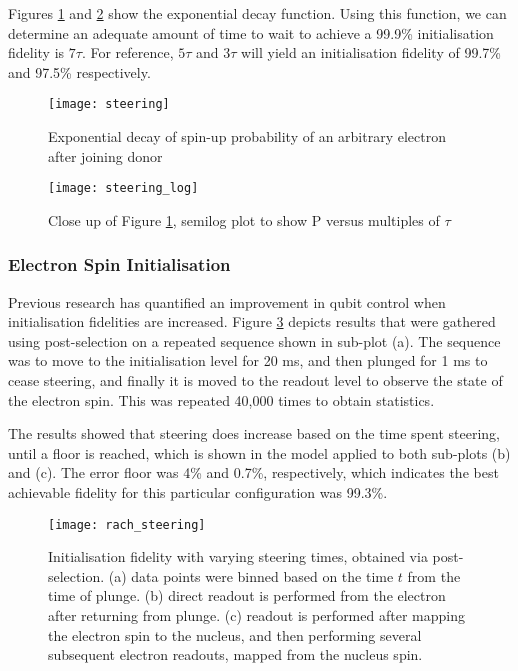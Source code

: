 	Figures \ref{fig::spin_steering} and \ref{fig::spin_steering_log} show the exponential decay function. Using this function, we can determine an adequate amount of time to wait to achieve a 99.9\% initialisation fidelity is $7 \tau$. For reference, $5 \tau$ and $3 \tau$ will yield an initialisation fidelity of 99.7\% and 97.5\% respectively.
	
	\begin{figure}[htbp!]
		\centering
		\texttt{[image: steering]}
		\caption{Exponential decay of spin-up probability of an arbitrary electron after joining donor}
		\label{fig::spin_steering}
	\end{figure}
	
	
	\begin{figure}[htbp!]
		\centering
		\texttt{[image: steering\_log]}
		\caption{Close up of Figure \ref{fig::spin_steering}, semilog plot to show P versus multiples of $\tau$}
		\label{fig::spin_steering_log}
	\end{figure}

\subsubsection{Electron Spin Initialisation}
\label{sec::spin_init}
Previous research \cite{rachpon_thesis} has quantified an improvement in qubit control when initialisation fidelities are increased. Figure \ref{fig::rach_steering} depicts results that were gathered using post-selection on a repeated sequence shown in sub-plot (a). The sequence was to move to the initialisation level for 20 ms, and then plunged for 1 ms to cease steering, and finally it is moved to the readout level to observe the state of the electron spin. This was repeated 40,000 times to obtain statistics. 

The results showed that steering does increase based on the time spent steering, until a floor is reached, which is shown in the model applied to both sub-plots (b) and (c). The error floor was 4\% and 0.7\%, respectively, which indicates the best achievable fidelity for this particular configuration was 99.3\%.

\begin{figure}[htbp!]
	\centering
	\texttt{[image: rach\_steering]}
	\caption{Initialisation fidelity with varying steering times, obtained via post-selection.
		(a) data points were binned based on the time $t$ from the time of plunge. 
		(b) direct readout is performed from the electron after returning from plunge.
		(c) readout is performed after mapping the electron spin to the nucleus, and then performing several subsequent electron readouts, mapped from the nucleus spin.
		\cite{rachpon_thesis}}
	\label{fig::rach_steering}
\end{figure}


